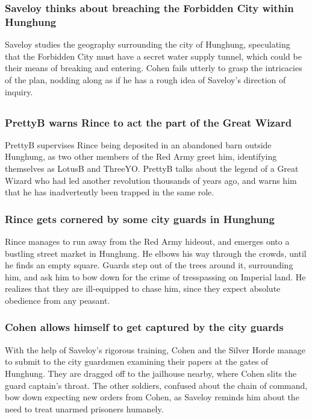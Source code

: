 \subsubsection{\Gls{Saveloy} thinks about breaching the Forbidden City within Hunghung}
\Gls{Saveloy} studies the geography surrounding the city of Hunghung, speculating that the Forbidden
City must have a secret water supply tunnel, which could be their means of breaking and entering.
\Gls{Cohen} fails utterly to grasp the intricacies of the plan, nodding along as if he has a rough
idea of \Gls{Saveloy}'s direction of inquiry.

\subsection{}
\subsubsection{\Gls{PrettyB} warns \Gls{Rince} to act the part of the Great Wizard}
\Gls{PrettyB} supervises \Gls{Rince} being deposited in an abandoned barn outside Hunghung, as two
other members of the Red Army greet him, identifying themselves as \Gls{LotusB} and \Gls{ThreeYO}.
\Gls{PrettyB} talks about the legend of a Great Wizard who had led another revolution thousands of
years ago, and warns him that he has inadvertently been trapped in the same role.

\subsubsection{\Gls{Rince} gets cornered by some city guards in Hunghung}
\Gls{Rince} manages to run away from the Red Army hideout, and emerges onto a bustling street market
in Hunghung. He elbows his way through the crowds, until he finds an empty square. Guards step out
of the trees around it, surrounding him, and ask him to bow down for the crime of tresspassing on
Imperial land. He realizes that they are ill-equipped to chase him, since they expect absolute
obedience from any peasant.

\subsubsection{\Gls{Cohen} allows himself to get captured by the city guards}
With the help of \Gls{Saveloy}'s rigorous training, \Gls{Cohen} and the Silver Horde manage to
submit to the city guardsmen examining their papers at the gates of Hunghung. They are dragged off
to the jailhouse nearby, where \Gls{Cohen} slits the guard captain's throat. The other soldiers,
confused about the chain of command, bow down expecting new orders from \Gls{Cohen}, as
\Gls{Saveloy} reminds him about the need to treat unarmed prisoners humanely.

